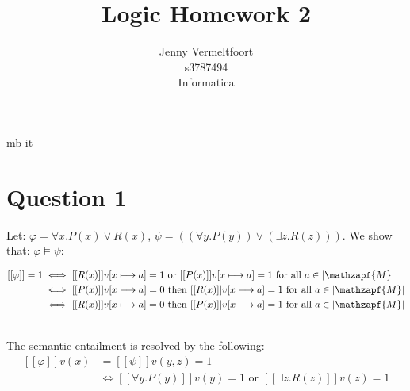 \documentclass{article}
\title{Logic Homework 2}
\author{Jenny Vermeltfoort\\
  s3787494\\
  Informatica%
}
\begin{document}
\renewcommand*{\phi}{\varphi}
\renewcommand*{\epsilon}{\varepsilon}
\DeclareMathAlphabet{} {mb} {it}

\maketitle

\section*{Question 1}


Let: $ \phi = \forall x.P(x) \lor R(x) $, $ \psi = ((\forall y.P(y)) \lor (\exists z.R(z))) $. We show that: $ \phi  \models \psi $:

\begin{subequations}
\begin{align}
[[\phi]] = 1 &\iff [[R(x)]]v[x \longmapsto a] = 1 \text{ or } [[P(x)]]v[x \longmapsto a] = 1 \text{ for all } a \in |\mathzapf{M}|  \nonumber \\
& \iff [[P(x)]]v[x \longmapsto a] = 0 \text{ then } [[R(x)]]v[x \longmapsto a] = 1 \text{ for all } a \in |\mathzapf{M}| \label{eqn:line-4}\\
& \iff [[R(x)]]v[x \longmapsto a] = 0 \text{ then } [[P(x)]]v[x \longmapsto a] = 1 \text{ for all } a \in |\mathzapf{M}| \label{eqn:line-5}\\
  \nonumber
\end{align}
\end{subequations}

The semantic entailment is resolved by the following:
\begin{equation*}
\begin{split} 
  [[\phi]]v(x) &= [[\psi]]v(y,z) = 1 \\
    &\iff [[\forall y.P(y)]]v(y) = 1 \text{ or } [[\exists z.R(z)]]v(z) = 1 
\end{split}
\end{equation*}
\end{document}
